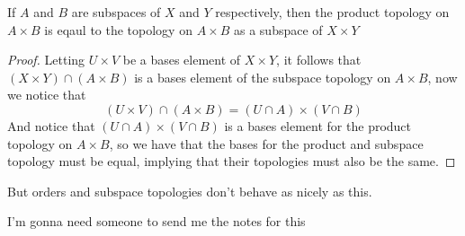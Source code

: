 \begin{theorem}
    If $A$ and $B$ are subspaces of $X$ and $Y$ respectively, then the product topology on $A\times B$ is eqaul to the topology on $A\times B$ as a subspace of $X\times Y$
\end{theorem}
\begin{proof}
    Letting $U\times V$ be a bases element of $X\times Y$, it follows that $(X\times Y)\cap (A\times B)$ is a bases element of the subspace topology on $A\times B$, now we notice that \[(U\times V)\cap (A\times B) = (U\cap A)\times(V\cap B)\]
    And notice that $(U\cap A)\times(V\cap B)$ is a bases element for the product topology on $A\times B$, so we have that the bases for the product and subspace topology must be equal, implying that their topologies must also be the same.
\end{proof}
\begin{remark}
    But orders and subspace topologies don't behave as nicely as this.
\end{remark}
\begin{example}
    I'm gonna need someone to send me the notes for this
\end{example}
